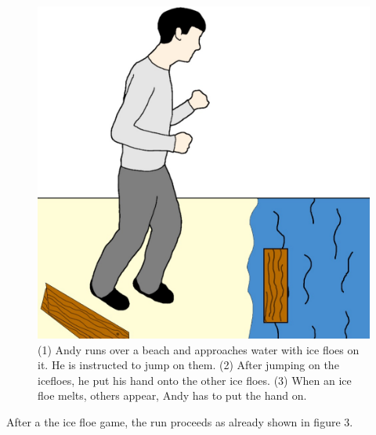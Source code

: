\documentclass[twocolumn,showpacs,%
  nofootinbib,aps,superscriptaddress,%
  eqsecnum,prd,notitlepage,showkeys,10pt]{revtex4-1}
\begin{document}
\begin{figure}[!htb]
\endminipage\hfill
{}%
  \includegraphics[width=\linewidth]{graphics/Image(9).jpg}
\endminipage
  \caption{(1) Andy runs over a beach and approaches water with ice floes on it. He is instructed to jump on them. (2) After jumping on the icefloes, he put his hand onto the other ice floes. (3) When an ice floe melts, others appear, Andy has to put the hand on.}\label{fig:awesome_image3}
\end{figure}


After a the ice floe game, the run proceeds as already shown in figure 3.
\end{document}
